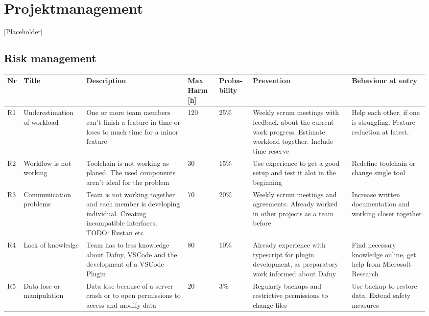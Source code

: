 \section{Projektmanagement}
[Placeholder]
\subsection{Risk management}
\begin{landscape}
	\begin{longtable}[H]
		{l|p{}| p{} | p{} | p{} | p{} | p{}}
		
		\textbf{Nr} & \textbf{Title} & \textbf{Description} & 
		\textbf{Max Harm [h]} & \textbf{Proba- bility} & \textbf{Prevention} &  
		\textbf{Behaviour at entry}\\ \hline
		
		R1 & Underestimation of workload & One or more team members can't finish a feature in time or loses to much time for a minor feature & 120 & 25\% & Weekly scrum meetings with feedback about the current work progress. Estimate workload together. Include time reserve & Help each other, if one is struggling. Feature reduction at latest. \\ 
		
		R2 & Workflow is not working & Toolchain is not working as planed. The used components aren't ideal for the problem & 30 & 15\% & Use experience to get a good setup and test it alot in the beginning & Redefine toolchain or change single tool \\ 
		
		R3 & Communication problems & Team is not working together and each member is developing individual. Creating incompatible interfaces. TODO: Rustan etc & 70 & 20\% & Weekly scrum meetings and agreements. Already worked in other projects as a team before & Increase written documentation and working closer together \\ 
		
		R4 & Lack of knowledge & Team has to less knowledge about Dafny, VSCode and the development of a VSCode Plugin & 80 & 10\% & Already experience with typescript for plugin development, as preparatory work informed about Dafny & Find necessary knowledge online, get help from Microsoft Research \\ 
		
		R5 & Data lose or manipulation & Data lose because of a server crash or to open permissions to access and modify data & 20 & 3\% & Regularly backups and restrictive permissions to change files & Use backup to restore data. Extend safety measures \\ 
		

\end{longtable}
\end{landscape}
